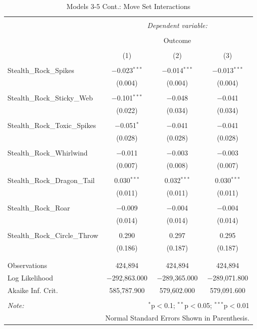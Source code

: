 \documentclass[12pt,twoside]{reedthesis}
\begin{document}
  \begin{table}[!htbp] \centering 
    \caption{Models 3-5 Cont.: Move Set Interactions} 
    \label{} 
  \begin{tabular}{@{\extracolsep{5pt}}lccc} 
  \\[-1.8ex]\hline 
  \hline \\[-1.8ex] 
   & \multicolumn{3}{c}{\textit{Dependent variable:}} \\ 
  \cline{2-4} 
  \\[-1.8ex] & \multicolumn{3}{c}{Outcome} \\ 
  \\[-1.8ex] & (1) & (2) & (3)\\ 
  \hline \\[-1.8ex] 
   Stealth\_Rock\_Spikes & $-$0.023$^{***}$ & $-$0.014$^{***}$ & $-$0.013$^{***}$ \\ 
    & (0.004) & (0.004) & (0.004) \\ 
    & & & \\ 
   Stealth\_Rock\_Sticky\_Web & $-$0.101$^{***}$ & $-$0.048 & $-$0.041 \\ 
    & (0.022) & (0.034) & (0.034) \\ 
    & & & \\ 
   Stealth\_Rock\_Toxic\_Spikes & $-$0.051$^{*}$ & $-$0.041 & $-$0.041 \\ 
    & (0.028) & (0.028) & (0.028) \\ 
    & & & \\ 
   Stealth\_Rock\_Whirlwind & $-$0.011 & $-$0.003 & $-$0.003 \\ 
    & (0.007) & (0.008) & (0.007) \\ 
    & & & \\ 
   Stealth\_Rock\_Dragon\_Tail & 0.030$^{***}$ & 0.032$^{***}$ & 0.030$^{***}$ \\ 
    & (0.011) & (0.011) & (0.011) \\ 
    & & & \\ 
   Stealth\_Rock\_Roar & $-$0.009 & $-$0.004 & $-$0.004 \\ 
    & (0.014) & (0.014) & (0.014) \\ 
    & & & \\ 
   Stealth\_Rock\_Circle\_Throw & 0.290 & 0.297 & 0.295 \\ 
    & (0.186) & (0.187) & (0.187) \\ 
    & & & \\ 
  \hline \\[-1.8ex] 
  Observations & 424,894 & 424,894 & 424,894 \\ 
  Log Likelihood & $-$292,863.000 & $-$289,365.000 & $-$289,071.800 \\ 
  Akaike Inf. Crit. & 585,787.900 & 579,602.000 & 579,091.600 \\ 
  \hline 
  \hline \\[-1.8ex] 
  \textit{Note:}  & \multicolumn{3}{r}{$^{*}$p$<$0.1; $^{**}$p$<$0.05; $^{***}$p$<$0.01} \\ 
   & \multicolumn{3}{r}{Normal Standard Errors Shown in Parenthesis.} \\ 
  \end{tabular} 
  \end{table}
  
\end{document}
